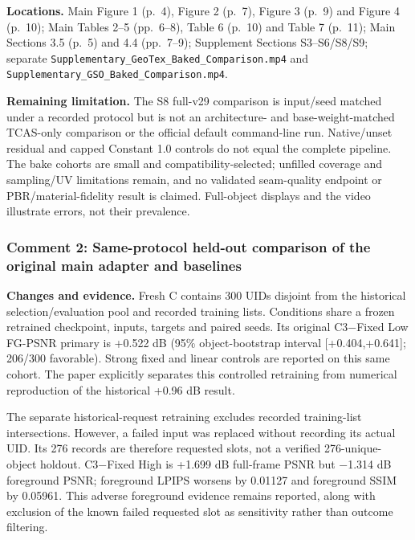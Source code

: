 \documentclass[
  10pt,
]{article}
\begin{document}
\textbf{Locations.} Main Figure 1 (p.~4), Figure 2 (p.~7), Figure 3
(p.~9) and Figure 4 (p.~10); Main Tables 2--5 (pp.~6--8), Table 6
(p.~10) and Table 7 (p.~11); Main Sections 3.5 (p.~5) and 4.4
(pp.~7--9); Supplement Sections S3--S6/S8/S9; separate
\texttt{Supplementary\_GeoTex\_Baked\_Comparison.mp4} and
\texttt{Supplementary\_GSO\_Baked\_Comparison.mp4}.

\textbf{Remaining limitation.} The S8 full-v29 comparison is input/seed
matched under a recorded protocol but is not an architecture- and
base-weight-matched TCAS-only comparison or the official default
command-line run. Native/unset residual and capped Constant 1.0 controls
do not equal the complete pipeline. The bake cohorts are small and
compatibility-selected; unfilled coverage and sampling/UV limitations
remain, and no validated seam-quality endpoint or PBR/material-fidelity
result is claimed. Full-object displays and the video illustrate errors,
not their prevalence.

\hypertarget{comment-2-same-protocol-held-out-comparison-of-the-original-main-adapter-and-baselines}{%
\subsubsection{Comment 2: Same-protocol held-out comparison of the
original main adapter and
baselines}\label{comment-2-same-protocol-held-out-comparison-of-the-original-main-adapter-and-baselines}}

\textbf{Changes and evidence.} Fresh C contains 300 UIDs disjoint from
the historical selection/evaluation pool and recorded training lists.
Conditions share a frozen retrained checkpoint, inputs, targets and
paired seeds. Its original C3−Fixed Low FG-PSNR primary is +0.522 dB
(95\% object-bootstrap interval {[}+0.404,+0.641{]}; 206/300 favorable).
Strong fixed and linear controls are reported on this same cohort. The
paper explicitly separates this controlled retraining from numerical
reproduction of the historical +0.96 dB result.

The separate historical-request retraining excludes recorded
training-list intersections. However, a failed input was replaced
without recording its actual UID. Its 276 records are therefore
requested slots, not a verified 276-unique-object holdout. C3−Fixed High
is +1.699 dB full-frame PSNR but −1.314 dB foreground PSNR; foreground
LPIPS worsens by 0.01127 and foreground SSIM by 0.05961. This adverse
foreground evidence remains reported, along with exclusion of the known
failed requested slot as sensitivity rather than outcome filtering.
\end{document}
